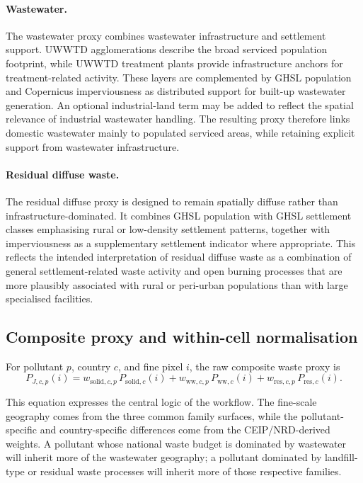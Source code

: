 \paragraph{Wastewater.}
The wastewater proxy combines wastewater infrastructure and settlement
support. UWWTD agglomerations describe the broad serviced population
footprint, while UWWTD treatment plants provide infrastructure anchors
for treatment-related activity. These layers are complemented by GHSL
population and Copernicus imperviousness as distributed support for
built-up wastewater generation. An optional industrial-land term may be
added to reflect the spatial relevance of industrial wastewater
handling. The resulting proxy therefore links domestic wastewater mainly
to populated serviced areas, while retaining explicit support from
wastewater infrastructure.

\paragraph{Residual diffuse waste.}
The residual diffuse proxy is designed to remain spatially diffuse
rather than infrastructure-dominated. It combines GHSL population with
GHSL settlement classes emphasising rural or low-density settlement
patterns, together with imperviousness as a supplementary settlement
indicator where appropriate. This reflects the intended interpretation
of residual diffuse waste as a combination of general settlement-related
waste activity and open burning processes that are more plausibly
associated with rural or peri-urban populations than with large
specialised facilities.

\subsection{Composite proxy and within-cell normalisation}

For pollutant $p$, country $c$, and fine pixel $i$, the raw composite
waste proxy is
\begin{equation}
  P_{J,c,p}(i) =
  w_{\mathrm{solid},c,p} \, P_{\mathrm{solid},c}(i)
  + w_{\mathrm{ww},c,p} \, P_{\mathrm{ww},c}(i)
  + w_{\mathrm{res},c,p} \, P_{\mathrm{res},c}(i).
\end{equation}

This equation expresses the central logic of the workflow. The
fine-scale geography comes from the three common family surfaces, while
the pollutant-specific and country-specific differences come from the
CEIP/NRD-derived weights. A pollutant whose national waste budget is
dominated by wastewater will inherit more of the wastewater geography;
a pollutant dominated by landfill-type or residual waste processes will
inherit more of those respective families.

